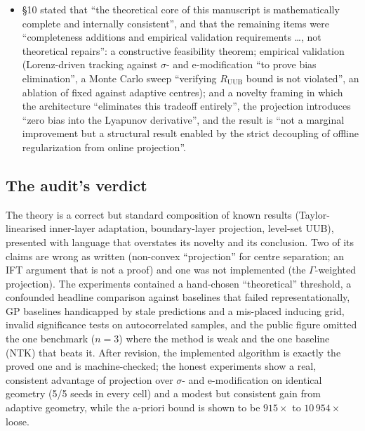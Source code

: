 \begin{itemize}
    (Hessian blow-up near $\sigma \to 0$); offline Tikhonov regularisation (circular self-consistency of the
    projection geometry); a smooth convex projection operator (a cancellation gap when the projection is active);
    the projection's hard energy cap (the LaSalle and Barbalat requirements); and stability from the Lyapunov
    function and the projection alone (the circularity of ICL, which needs bounded states).
  \item \S10 stated that ``the theoretical core of this manuscript is mathematically complete and internally
    consistent'', and that the remaining items were ``completeness additions and empirical validation requirements
    \ldots, not theoretical repairs'': a constructive feasibility theorem; empirical validation (Lorenz-driven
    tracking against $\sigma$- and e-modification ``to prove bias elimination'', a Monte Carlo sweep ``verifying
    $R_{\mathrm{UUB}}$ bound is not violated'', an ablation of fixed against adaptive centres); and a novelty framing
    in which the architecture ``eliminates this tradeoff entirely'', the projection introduces ``zero bias into the
    Lyapunov derivative'', and the result is ``not a marginal improvement but a structural result enabled by the
    strict decoupling of offline regularization from online projection''.
\end{itemize}

\subsection{The audit's verdict}

The theory is a correct but standard composition of known results (Taylor-linearised inner-layer adaptation,
boundary-layer projection, level-set UUB), presented with language that overstates its novelty and its conclusion.
Two of its claims are wrong as written (non-convex ``projection'' for centre separation; an IFT argument that is not a
proof) and one was not implemented (the $\Gamma$-weighted projection). The experiments contained a hand-chosen
``theoretical'' threshold, a confounded headline comparison against baselines that failed representationally, GP
baselines handicapped by stale predictions and a mis-placed inducing grid, invalid significance tests on
autocorrelated samples, and the public figure omitted the one benchmark ($n = 3$) where the method is weak and the one
baseline (NTK) that beats it. After revision, the implemented algorithm is exactly the proved one and is
machine-checked; the honest experiments show a real, consistent advantage of projection over $\sigma$- and
e-modification on identical geometry (5/5 seeds in every cell) and a modest but consistent gain from adaptive
geometry, while the a-priori bound is shown to be $915\times$ to $10\,954\times$ loose.

